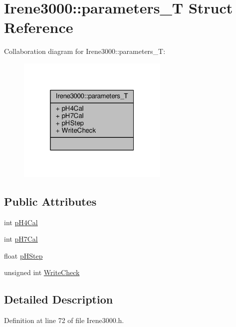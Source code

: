 \hypertarget{structIrene3000_1_1parameters__T}{}\section{Irene3000\+:\+:parameters\+\_\+T Struct Reference}
\label{structIrene3000_1_1parameters__T}


Collaboration diagram for Irene3000\+:\+:parameters\+\_\+T\+:
\nopagebreak
\begin{figure}[H]
\begin{center}
\leavevmode
\includegraphics[width=205pt]{structIrene3000_1_1parameters__T__coll__graph}
\end{center}
\end{figure}
\subsection*{Public Attributes}
\begin{DoxyCompactItemize}
\item 
int \hyperlink{structIrene3000_1_1parameters__T_a1144de6fb54eb3e1dd2a3d8c2afc97dc}{p\+H4\+Cal}
\item 
int \hyperlink{structIrene3000_1_1parameters__T_a21265466a570d84bff914f26d2f7a03e}{p\+H7\+Cal}
\item 
float \hyperlink{structIrene3000_1_1parameters__T_a61cfcc2539d5f630e9071f3753aba9fe}{p\+H\+Step}
\item 
unsigned int \hyperlink{structIrene3000_1_1parameters__T_a56f1f14d33a69300d580eda2dc52cecd}{Write\+Check}
\end{DoxyCompactItemize}


\subsection{Detailed Description}


Definition at line 72 of file Irene3000.\+h.



